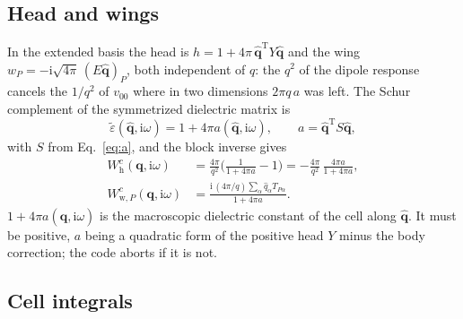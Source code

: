 \documentclass[%
 reprint,
superscriptaddress,
 amsmath,amssymb,
 aps,
prb,
]{revtex4-2}
\newcommand{\bq}{\mathbf{q}}
\newcommand{\qhat}{\hat{\mathbf{q}}}
\newcommand{\ii}{\mathrm{i}}
\newcommand{\Tr}{\mathrm{T}}
\newcommand{\head}{\mathrm{h}}
\newcommand{\wing}{\mathrm{w}}
\begin{document}
\subsection{Head and wings}
\label{sec:hw3d}

In the extended basis the head is $h = 1 + 4\pi\,\qhat^\Tr Y\qhat$ and the wing
$w_P = -\ii\sqrt{4\pi}\,(E\qhat)_P$, both independent of $q$: the $q^2$ of the dipole response
cancels the $1/q^2$ of $v_{00}$ where in two dimensions $2\pi q\,a$ was left. The Schur
complement of the symmetrized dielectric matrix is
\begin{equation}
  \tilde\varepsilon(\qhat,\ii\omega) = 1 + 4\pi a(\qhat,\ii\omega),\qquad a = \qhat^\Tr S\qhat,
  \label{eq:epstilde}
\end{equation}
with $S$ from Eq.~\eqref{eq:a}, and the block inverse gives
\begin{align}
  W^c_{\head}(\bq,\ii\omega) &= \frac{4\pi}{q^2}\Big(\frac{1}{1+4\pi a}-1\Big)
  = -\frac{4\pi}{q^2}\,\frac{4\pi a}{1+4\pi a},
  \label{eq:headwing3d}\\
  W^c_{\wing,P}(\bq,\ii\omega) &= \frac{\ii\,(4\pi/q)\sum_\alpha\hat q_\alpha T_{P\alpha}}{1+4\pi a}.
  \label{eq:wing3d}
\end{align}
$1 + 4\pi a(\qhat,\ii\omega)$ is the macroscopic dielectric constant of the cell along $\qhat$.
It must be positive, $a$ being a quadratic form of the positive head $Y$ minus the body
correction; the code aborts if it is not.

\subsection{Cell integrals}
\label{sec:cell3d}
\end{document}
